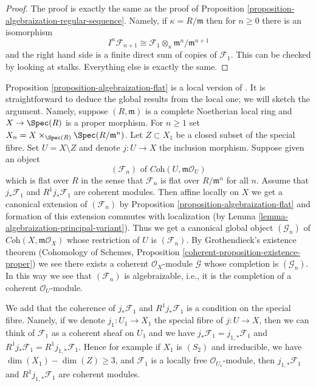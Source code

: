 \begin{proof}
The proof is exactly the same as the proof of
Proposition \ref{proposition-algebraization-regular-sequence}.
Namely, if $\kappa = R/\mathfrak m$ then for $n \geq 0$
there is an isomorphism
$$
I^n \mathcal{F}_{n + 1} \cong
\mathcal{F}_1 \otimes_\kappa \mathfrak m^n/\mathfrak m^{n + 1}
$$
and the right hand side is a finite direct sum of copies
of $\mathcal{F}_1$. This can be checked by looking at stalks.
Everything else is exactly the same.
\end{proof}

\begin{remark}
\label{remark-interesting-case-quater}
Proposition \ref{proposition-algebraization-flat} is a local version
of \cite[Theorem 2.10 (i)]{Baranovsky}. It is straightforward to deduce
the global results from the local one; we will sketch the argument.
Namely, suppose $(R, \mathfrak m)$
is a complete Noetherian local ring and $X \to \Spec(R)$ is a proper morphism.
For $n \geq 1$ set $X_n = X \times_{\Spec(R)} \Spec(R/\mathfrak m^n)$.
Let $Z \subset X_1$ be a closed subset of the special fibre.
Set $U = X \setminus Z$ and denote $j : U \to X$ the inclusion morphism.
Suppose given an object
$$
(\mathcal{F}_n) \text{ of } \textit{Coh}(U, \mathfrak m\mathcal{O}_U)
$$
which is flat over $R$ in the sense that $\mathcal{F}_n$ is flat over
$R/\mathfrak m^n$ for all $n$.
Assume that $j_*\mathcal{F}_1$ and $R^1j_*\mathcal{F}_1$ are coherent
modules. Then affine locally on $X$ we get a canonical extension
of $(\mathcal{F}_n)$ by
Proposition \ref{proposition-algebraization-flat}
and formation of this extension commutes with localization
(by Lemma \ref{lemma-algebraization-principal-variant}).
Thus we get a canonical global object $(\mathcal{G}_n)$ of
$\textit{Coh}(X, \mathfrak m\mathcal{O}_X)$
whose restriction of $U$ is $(\mathcal{F}_n)$.
By Grothendieck's existence theorem
(Cohomology of Schemes, Proposition
\ref{coherent-proposition-existence-proper})
we see there exists a coherent $\mathcal{O}_X$-module
$\mathcal{G}$ whose completion is $(\mathcal{G}_n)$.
In this way we see that $(\mathcal{F}_n)$ is algebraizable, i.e.,
it is the completion of a coherent $\mathcal{O}_U$-module.

\medskip\noindent
We add that the coherence of $j_*\mathcal{F}_1$ and $R^1j_*\mathcal{F}_1$
is a condition on the special fibre. Namely, if we denote
$j_1 : U_1 \to X_1$ the special fibre of $j : U \to X$, then we can
think of $\mathcal{F}_1$ as a coherent sheaf on $U_1$ and we have
$j_*\mathcal{F}_1 = j_{1, *}\mathcal{F}_1$ and
$R^1j_*\mathcal{F}_1 = R^1j_{1, *}\mathcal{F}_1$.
Hence for example if $X_1$ is $(S_2)$ and irreducible, we have
$\dim(X_1) - \dim(Z) \geq 3$, and $\mathcal{F}_1$ is a locally free
$\mathcal{O}_{U_1}$-module, then $j_{1, *}\mathcal{F}_1$ and
$R^1j_{1, *}\mathcal{F}_1$ are coherent modules.
\end{remark}










